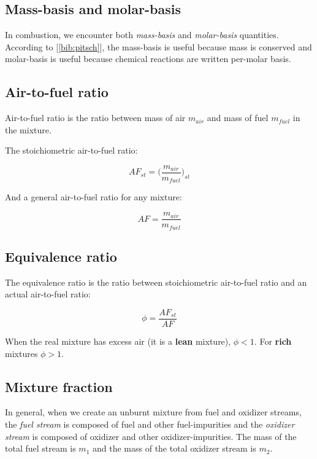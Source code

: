 \documentclass[10pt,twocolumn]{article}
\begin{document}
\subsection{Mass-basis and molar-basis}

In combustion, we encounter both \textit{mass-basis} and \textit{molar-basis} quantities. According to [\ref{bib:pitsch}], the mass-basis is useful because mass is conserved and molar-basis is useful because chemical reactions are written per-molar basis.

\subsection{Air-to-fuel ratio}

Air-to-fuel ratio is the ratio between mass of air $m_{air}$ and mass of fuel $m_{fuel}$ in the mixture.

The stoichiometric air-to-fuel ratio:

\begin{equation}
AF_{st} = \Big( \frac{m_{air}}{m_{fuel}} \Big)_{st}
\end{equation}

And a general air-to-fuel ratio for any mixture:

\begin{equation}
AF = \frac{m_{air}}{m_{fuel}}
\end{equation}

\subsection{Equivalence ratio}

The equivalence ratio is the ratio between stoichiometric air-to-fuel ratio and an actual air-to-fuel ratio:

\begin{equation}
\phi = \frac{AF_{st}}{AF}
\end{equation}

When the real mixture has excess air (it is a \textbf{lean} mixture), $\phi < 1$. For \textbf{rich} mixtures $\phi > 1$.

\subsection{Mixture fraction}

In general, when we create an unburnt mixture from fuel and oxidizer streams, the \textit{fuel stream} is composed of fuel and other fuel-impurities and the \textit{oxidizer stream} is composed of oxidizer and other oxidizer-impurities. The mass of the total fuel stream is $m_1$ and the mass of the total oxidizer stream is $m_2$.
\end{document}
